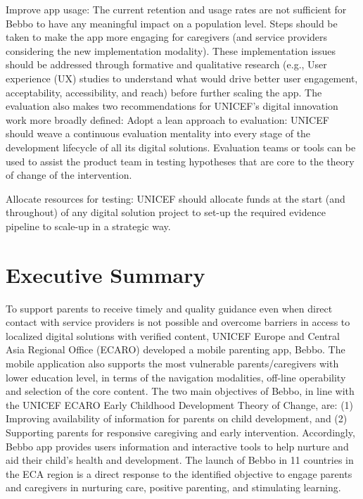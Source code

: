 \documentclass{article}
\begin{document}
Improve app usage: The current retention and usage rates are not sufficient for Bebbo to have any meaningful impact on a population level. Steps should be taken to make the app more engaging for caregivers (and service providers considering the new implementation modality). These implementation issues should be addressed through formative and qualitative research (e.g., User experience (UX) studies to understand what would drive better user engagement, acceptability, accessibility, and reach) before further scaling the app.
The evaluation also makes two recommendations for UNICEF’s digital innovation work more broadly defined:
 Adopt a lean approach to evaluation: UNICEF should weave a continuous evaluation mentality into every stage of the development lifecycle of all its digital solutions. Evaluation teams or tools can be used to assist the product team in testing hypotheses that are core to the theory of change of the intervention.

Allocate resources for testing: UNICEF should allocate funds at the start (and throughout) of any digital solution project to set-up the required evidence pipeline to scale-up in a strategic way.


















\section{Executive Summary}

To support parents to receive timely and quality guidance even when direct contact with service  providers is not possible and overcome barriers in access to localized digital solutions with verified  content, UNICEF Europe and Central Asia Regional Office (ECARO) developed a mobile parenting app,  Bebbo. The mobile application also supports the most vulnerable parents/caregivers with lower  education level, in terms of the navigation modalities, off-line operability and selection of the core  content. The two main objectives of Bebbo, in line with the UNICEF ECARO Early Childhood  Development Theory of Change, are: (1) Improving availability of information for parents on child  development, and (2) Supporting parents for responsive caregiving and early intervention.  Accordingly, Bebbo app provides users information and interactive tools to help nurture and aid their  child’s health and development. The launch of Bebbo in 11 countries in the ECA region is a direct  response to the identified objective to engage parents and caregivers in nurturing care, positive  parenting, and stimulating learning.
\end{document}
